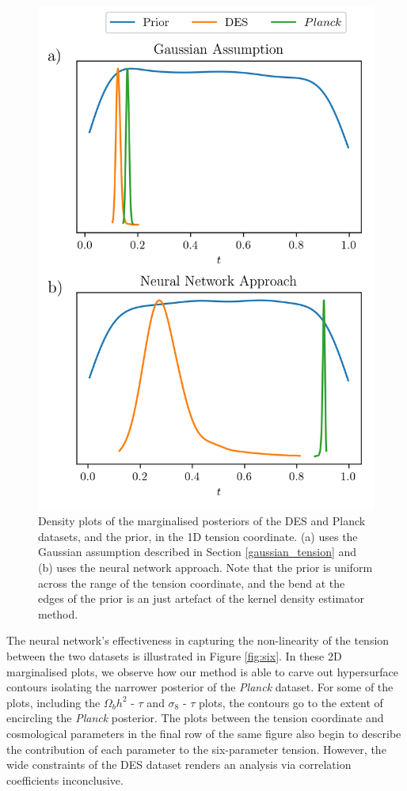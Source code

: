 \documentclass[%
 reprint,
 amsmath,amssymb,
 aps,
]{revtex4-2}
\begin{document}
\begin{figure}
    \includegraphics[width=0.8\columnwidth]{../plots/six_1d_compare.png}
    \centering
    \caption{Density plots of the marginalised posteriors of the DES and Planck datasets, and the prior, in the 1D tension coordinate. (a) uses the Gaussian assumption described in Section \ref{gaussian_tension} and (b) uses the neural network approach. Note that the prior is uniform across the range of the tension coordinate, and the bend at the edges of the prior is an just artefact of the kernel density estimator method.}
    \label{fig:six_compare}
\end{figure}

The neural network's effectiveness in capturing the non-linearity of the tension between the two datasets is illustrated in Figure \ref{fig:six}. In these 2D marginalised plots, we observe how our method is able to carve out hypersurface contours isolating the narrower posterior of the \textit{Planck} dataset. For some of the plots, including the $\Omega_b h^2$ - $\tau$ and $\sigma_8$ - $\tau$ plots, the contours go to the extent of encircling the \textit{Planck} posterior. The plots between the tension coordinate and cosmological parameters in the final row of the same figure also begin to describe the contribution of each parameter to the six-parameter tension. However, the wide constraints of the DES dataset renders an analysis via correlation coefficients inconclusive.
\end{document}
